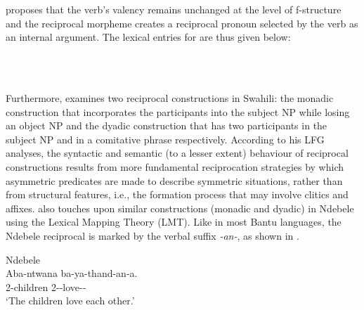 \documentclass[output=paper,hidelinks]{langscibook}
\begin{document}
\citet{Hurst:Syntaxa} proposes that the verb’s valency remains unchanged at the level of f-structure and the reciprocal morpheme creates a reciprocal pronoun selected by the verb as an internal argument. The lexical entries for  are thus given below:

\ea\label{ex:African:45}
\\[1ex]
\\[1ex]
\z

Furthermore, \citet{Hurst2010} examines two reciprocal constructions in Swahili: the monadic construction that incorporates the participants into the subject NP while losing an object NP and the dyadic construction that has two participants in the subject NP and in a comitative phrase respectively. According to his LFG analyses, the syntactic and semantic (to a lesser extent) behaviour of reciprocal constructions results from more fundamental reciprocation strategies by which asymmetric predicates are made to describe symmetric situations, rather than from structural features, i.e., the formation process that may involve clitics and affixes. \citet{Khumalo2014} also touches upon similar constructions (monadic and dyadic) in Ndebele using the Lexical Mapping Theory (LMT).  Like in most Bantu languages, the Ndebele reciprocal is marked by the verbal suffix \textit{-an-}, as shown in .

\ea\label{ex:African:46} Ndebele\\
    \gll Aba-ntwana ba-ya-thand-an-a.\\
        2-children     2-\PRS-love-{\RECP}-\\
    \glt ‘The children love each other.’
\z
\end{document}
